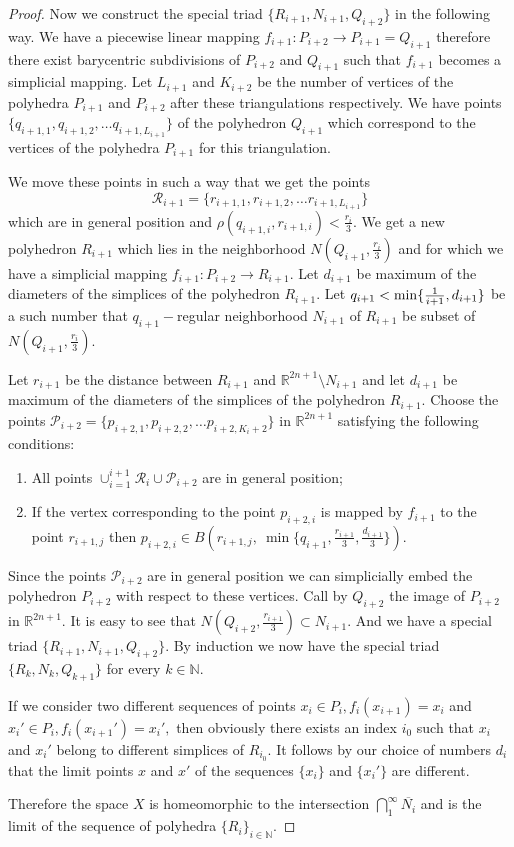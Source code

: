 \begin{proof}
Now we construct the special triad $\{R_{i+1}, N_{i+1}, Q_{i+2}\}$
in the following way. We have a piecewise linear mapping
$f_{i+1}:P_{i+2}\to P_{i+1} = Q_{i+1}$ therefore there exist
barycentric subdivisions of $P_{i+2}$ and $Q_{i+1}$ such that
$f_{i+1}$ becomes a simplicial mapping. Let $L_{i+1}$ and
$K_{i+2}$ be the number of vertices of the polyhedra $P_{i+1}$ and
$P_{i+2}$ after these triangulations respectively. We have points
$\{q_{i+1,1}, q_{i+1,2},\dots q_{i+1,L_{i+1}}\}$ of the polyhedron
$Q_{i+1}$ which correspond to the vertices of the polyhedra
$P_{i+1}$ for this triangulation. 

We move these points in such a
way that we get the points 
$$\mathcal{R}_{i+1} = \{r_{i+1,1},
r_{i+1,2},\dots r_{i+1,L_{i+1}}\}$$ 
which are in general position
and $\rho(q_{i+1,i}, r_{i+1,i}) < \frac{r_i}{3}.$ We get a new
polyhedron $R_{i+1}$ which lies in the neighborhood $N(Q_{i+1},
\frac{r_i}{3})$ and for which we have a simplicial mapping
$f_{i+1}:P_{i+2} \to R_{i+1}.$ Let $d_{i+1}$ be maximum of the
diameters of the simplices of the polyhedron $R_{i+1}.$ Let
$q_{i+1}< {\rm min} \{\frac{1}{i+1}, d_{i+1}\}$ be a such number
that $q_{i+1}-$regular neighborhood $N_{i+1}$ of $R_{i+1}$ be
subset of $N(Q_{i+1}, \frac{r_i}{3}).$ 

Let $r_{i+1}$ be the
distance between $R_{i+1}$ and $\mathbb{R}^{2n+1}\setminus
N_{i+1}$ and let $d_{i+1}$ be maximum of the diameters of the
simplices of the polyhedron $R_{i+1}.$ Choose the points
$\mathcal{P}_{i+2} = \{p_{i+2,1},p_{i+2,2},\dots p_{i+2,K_i+2}\}$
in $\mathbb{R}^{2n+1}$ satisfying the following conditions:
\begin{enumerate}
    \item All points $\cup_{i=1}^{i+1}\mathcal{R}_i\cup \mathcal{P}_{i+2}$ are in
    general position;
    \item If the vertex corresponding to the point $p_{i+2,i}$ is mapped by $f_{i+1}$ to the point
    $r_{i+1,j}$ then $p_{i+2,i}\in B(r_{i+1,j},\ \min\{q_{i+1}, \frac{r_{i+1}}{3},
    \frac{d_{i+1}}{3}\})$.
\end{enumerate}

Since the points $\mathcal{P}_{i+2}$ are in general position we
can simplicially embed the polyhedron $P_{i+2}$ with respect to
these vertices. Call by $Q_{i+2}$ the image of $P_{i+2}$ in
$\mathbb{R}^{2n+1}.$ It is easy to see that $N(Q_{i+2},
\frac{r_{i+1}}{3}) \subset N_{i+1}.$ And we have a special triad
$\{R_{i+1}, N_{i+1}, Q_{i+2}\}.$ By induction we now have the
special triad $\{R_k, N_k, Q_{k+1}\}$ for every $k\in \mathbb{N}.$

If we consider two different sequences of points $x_i \in P_i,
f_i(x_{i+1}) = x_i$ and $x_i' \in P_i, f_i(x_{i+1}') = x_i',$ then
obviously there exists an index $i_0$ such that $x_i$ and $x_i'$
belong
to different simplices
of $R_{i_0}.$ It follows by our
choice
of numbers $d_i$ that the limit points $x$ and $x'$ of
the sequences $\{x_i\}$ and $\{x_i'\}$ are different. 

Therefore
the space $X$ is homeomorphic to the intersection
$\bigcap_1^{\infty}\overline{N_i}$ and is the limit of the
sequence of polyhedra $\{R_i\}_{i \in \mathbb{N}}.$
\end{proof}

